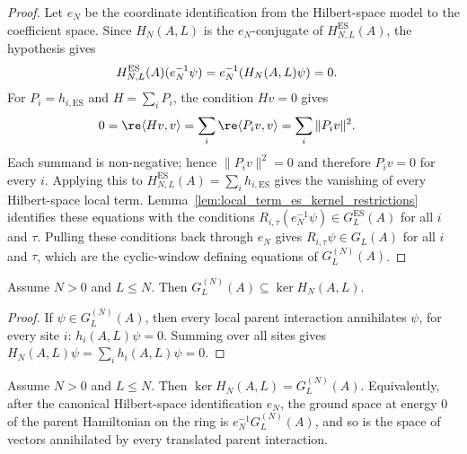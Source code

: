 \begin{proof}
    \leanok
    Let $e_N$ be the coordinate identification from the Hilbert-space
    model to the coefficient space. Since $H_N(A,L)$ is the $e_N$-conjugate of
    $H_{N,L}^{\mathrm{ES}}(A)$, the hypothesis gives
    \begin{align}
        H_{N,L}^{\mathrm{ES}}(A)(e_N^{-1}\psi)
         & =e_N^{-1}(H_N(A,L)\psi) =0. \notag
    \end{align}
    For $P_i=h_{i,\mathrm{ES}}$ and $H=\sum_iP_i$, the condition $Hv=0$ gives
    \begin{align}
        0
         & =\re\langle Hv,v\rangle =\sum_i\re\langle P_i v,v\rangle =\sum_i\|P_i v\|^2. \notag
    \end{align}
    Each summand is non-negative; hence $\|P_i v\|^2=0$ and therefore
    $P_i v=0$ for every $i$. Applying this to
    $H_{N,L}^{\mathrm{ES}}(A)=\sum_i h_{i,\mathrm{ES}}$ gives the vanishing of
    every Hilbert-space local term.
    Lemma~\ref{lem:local_term_es_kernel_restrictions} identifies these equations
    with the conditions
    $R_{i,\tau}(e_N^{-1}\psi)\in G_L^{\mathrm{ES}}(A)$ for all $i$ and $\tau$.
    Pulling these conditions back through $e_N$ gives
    $R_{i,\tau}\psi\in G_L(A)$ for all $i$ and $\tau$, which are the
    cyclic-window defining equations of $G_L^{(N)}(A)$.
\end{proof}

\begin{lemma}
    \label{lem:chain_ground_space_le_parent_hamiltonian_kernel}
    \leanok
    Assume $N>0$ and $L\le N$. Then
    $G_L^{(N)}(A)\subseteq\ker H_N(A,L)$.
\end{lemma}

\begin{proof}
    \leanok
    If $\psi\in G_L^{(N)}(A)$, then every local parent interaction annihilates
    $\psi$, for every site $i$: $h_i(A,L)\psi=0$. Summing over all sites gives
    $H_N(A,L)\psi=\sum_i h_i(A,L)\psi=0$.
\end{proof}

\begin{lemma}
    \label{thm:parent_hamiltonian_kernel_eq_chain_ground_space}
    \leanok
    Assume $N>0$ and $L\le N$. Then
    $\ker H_N(A,L)=G_L^{(N)}(A)$. Equivalently, after the canonical
    Hilbert-space identification $e_N$, the ground space at energy $0$ of the
    parent Hamiltonian on the ring is $e_N^{-1}G_L^{(N)}(A)$, and so is the
    space of vectors annihilated by every translated parent interaction.
\end{lemma}

